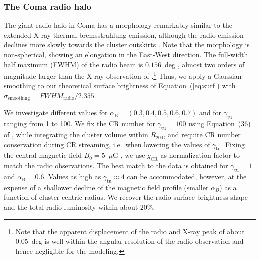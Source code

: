 \documentclass[traditabstract]{aa}
\newcommand{\rmn}{\mathrm}
\begin{document}
\subsubsection{The Coma radio halo}

The giant radio halo in Coma has a morphology remarkably similar to the extended
X-ray thermal bremsstrahlung emission, although the radio emission declines more
slowly towards the cluster outskirts
\citep{1992A&A...259L..31B,1997A&A...321...55D}. Note that the morphology is
non-spherical, showing an elongation in the East-West direction.  The full-width
half maximum (FWHM) of the radio beam is $0.156$~deg
\citep{1997A&A...321...55D}, almost two orders of magnitude larger than the
X-ray observation of \cite{1992A&A...259L..31B}.\footnote{Note that the apparent
  displacement of the radio and X-ray peak of about $0.05$~deg is well
  within the angular resolution of the radio observation and hence negligible
  for the modeling.}  Thus, we apply a Gaussian smoothing to our theoretical
surface brightness of Equation~(\ref{eq:surf}) with $\sigma_{\rmn{smoothing}} =
FWHM_{\rmn{radio}}/2.355$.

We investigate different values for $\alpha_{\rmn{B}}=(0.3,0.4,0.5,0.6,0.7)$ and
for $\gamma_{\rmn{tu}}$ ranging from 1 to 100. We fix the CR number for
$\gamma_{\rmn{tu}}=100$ using Equation~(36) of \cite{2011A&A...527A..99E}, while
integrating the cluster volume within $R_{200}$, and require CR number
conservation during CR streaming, i.e.~when lowering the values of
$\gamma_{\rmn{tu}}$. Fixing the central magnetic field $B_{0}=5$~$\mu$G
\citep{2010A&A...513A..30B}, we use $g_{\rmn{CR}}$ as normalization factor to
match the radio observations. The best match to the data is obtained for
$\gamma_{\rmn{tu}}=1$ and $\alpha_{\rmn{B}}=0.6$. Values as high as
$\gamma_{\rmn{tu}} \approx 4$ can be accommodated, however, at the expense of a
shallower decline of the magnetic field profile (smaller $\alpha_B$) as a
function of cluster-centric radius. We recover the radio surface brightness
shape and the total radio luminosity within about $20\%$. 
\end{document}
